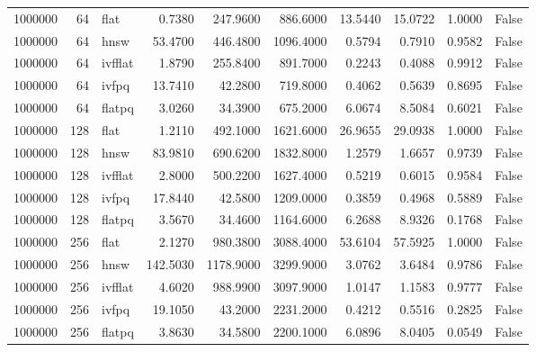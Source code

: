 \begin{tabular}{rrlrrrrrrr}
1000000 & 64 & flat & 0.7380 & 247.9600 & 886.6000 & 13.5440 & 15.0722 & 1.0000 & False \\
1000000 & 64 & hnsw & 53.4700 & 446.4800 & 1096.4000 & 0.5794 & 0.7910 & 0.9582 & False \\
1000000 & 64 & ivfflat & 1.8790 & 255.8400 & 891.7000 & 0.2243 & 0.4088 & 0.9912 & False \\
1000000 & 64 & ivfpq & 13.7410 & 42.2800 & 719.8000 & 0.4062 & 0.5639 & 0.8695 & False \\
1000000 & 64 & flatpq & 3.0260 & 34.3900 & 675.2000 & 6.0674 & 8.5084 & 0.6021 & False \\
1000000 & 128 & flat & 1.2110 & 492.1000 & 1621.6000 & 26.9655 & 29.0938 & 1.0000 & False \\
1000000 & 128 & hnsw & 83.9810 & 690.6200 & 1832.8000 & 1.2579 & 1.6657 & 0.9739 & False \\
1000000 & 128 & ivfflat & 2.8000 & 500.2200 & 1627.4000 & 0.5219 & 0.6015 & 0.9584 & False \\
1000000 & 128 & ivfpq & 17.8440 & 42.5800 & 1209.0000 & 0.3859 & 0.4968 & 0.5889 & False \\
1000000 & 128 & flatpq & 3.5670 & 34.4600 & 1164.6000 & 6.2688 & 8.9326 & 0.1768 & False \\
1000000 & 256 & flat & 2.1270 & 980.3800 & 3088.4000 & 53.6104 & 57.5925 & 1.0000 & False \\
1000000 & 256 & hnsw & 142.5030 & 1178.9000 & 3299.9000 & 3.0762 & 3.6484 & 0.9786 & False \\
1000000 & 256 & ivfflat & 4.6020 & 988.9900 & 3097.9000 & 1.0147 & 1.1583 & 0.9777 & False \\
1000000 & 256 & ivfpq & 19.1050 & 43.2000 & 2231.2000 & 0.4212 & 0.5516 & 0.2825 & False \\
1000000 & 256 & flatpq & 3.8630 & 34.5800 & 2200.1000 & 6.0896 & 8.0405 & 0.0549 & False \\
\bottomrule
\end{tabular}
